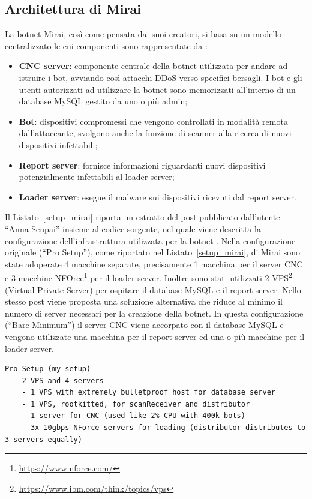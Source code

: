 \subsection{Architettura di Mirai}
La botnet Mirai, così come pensata dai suoi creatori, si basa su un modello centralizzato le cui componenti sono rappresentate da \cite{mirai_desc_architettura}:
\begin{itemize}
    \item \textbf{CNC server}: componente centrale della botnet utilizzata per andare ad istruire i bot, avviando così attacchi DDoS verso specifici bersagli. I bot e gli utenti autorizzati ad utilizzare la botnet sono memorizzati all'interno di un database MySQL gestito da uno o più admin;
    \item \textbf{Bot}: dispositivi compromessi che vengono controllati in modalità remota dall'attaccante, svolgono anche la funzione di scanner alla ricerca di nuovi dispositivi infettabili;
    \item \textbf{Report server}: fornisce informazioni riguardanti nuovi dispositivi potenzialmente infettabili al loader server;
    \item \textbf{Loader server}: esegue il malware sui dispositivi ricevuti dal report server.
\end{itemize}
Il Listato~\ref{setup_mirai} riporta un estratto del post pubblicato dall'utente ``Anna-Senpai'' insieme al codice sorgente, nel quale viene descritta la configurazione dell'infrastruttura utilizzata per la botnet \cite{post_originale_mirai}. Nella configurazione originale (``Pro Setup''), come riportato nel Listato~\ref{setup_mirai}, di Mirai sono state adoperate 4 macchine separate, precisamente 1 macchina per il server CNC e 3 macchine NFOrce\footnote{{\url{https://www.nforce.com/}}} per il loader server. Inoltre sono stati utilizzati 2 VPS\footnote{\url{https://www.ibm.com/think/topics/vps}} (Virtual Private Server) per ospitare il database MySQL e il report server. Nello stesso post viene proposta una soluzione alternativa che riduce al minimo il numero di server necessari per la creazione della botnet. In questa configurazione (``Bare Minimum'') il server CNC viene accorpato con il database MySQL e vengono utilizzate una macchina per il report server ed una o più macchine per il loader server.
\begin{lstlisting}[caption={Configurazione della botnet proposta dall'autore ``Anna-Senpai'' .}, label={setup_mirai}]
    Pro Setup (my setup)
    2 VPS and 4 servers
    - 1 VPS with extremely bulletproof host for database server
    - 1 VPS, rootkitted, for scanReceiver and distributor
    - 1 server for CNC (used like 2% CPU with 400k bots)
    - 3x 10gbps NForce servers for loading (distributor distributes to 3 servers equally)
\end{lstlisting}
